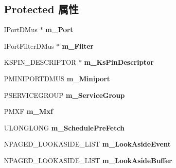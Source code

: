 \subsection*{Protected 属性}
\begin{DoxyCompactItemize}
\item 
\mbox{\label{class_c_port_pin_d_mus_a347a9e04b86f44232d704b138cc05302}} 
I\+Port\+D\+Mus $\ast$ {\bfseries m\+\_\+\+Port}
\item 
\mbox{\label{class_c_port_pin_d_mus_aad98338e05beff90c53315bbf138231e}} 
I\+Port\+Filter\+D\+Mus $\ast$ {\bfseries m\+\_\+\+Filter}
\item 
\mbox{\label{class_c_port_pin_d_mus_addd908cbfb589bab368404f50b5ce1af}} 
K\+S\+P\+I\+N\+\_\+\+D\+E\+S\+C\+R\+I\+P\+T\+OR $\ast$ {\bfseries m\+\_\+\+Ks\+Pin\+Descriptor}
\item 
\mbox{\label{class_c_port_pin_d_mus_a1666e6332ef57659fbe99873211aaf1b}} 
P\+M\+I\+N\+I\+P\+O\+R\+T\+D\+M\+US {\bfseries m\+\_\+\+Miniport}
\item 
\mbox{\label{class_c_port_pin_d_mus_a4489efd3f45607c092f59fb397ac84b8}} 
P\+S\+E\+R\+V\+I\+C\+E\+G\+R\+O\+UP {\bfseries m\+\_\+\+Service\+Group}
\item 
\mbox{\label{class_c_port_pin_d_mus_aff66ac122119d0d14c7b9533f435c646}} 
P\+M\+XF {\bfseries m\+\_\+\+Mxf}
\item 
\mbox{\label{class_c_port_pin_d_mus_afaeeb6ac59425ba3643200a0e7702ae6}} 
U\+L\+O\+N\+G\+L\+O\+NG {\bfseries m\+\_\+\+Schedule\+Pre\+Fetch}
\item 
\mbox{\label{class_c_port_pin_d_mus_a285dd2045b4ab91018d698f3894ca696}} 
N\+P\+A\+G\+E\+D\+\_\+\+L\+O\+O\+K\+A\+S\+I\+D\+E\+\_\+\+L\+I\+ST {\bfseries m\+\_\+\+Look\+Aside\+Event}
\item 
\mbox{\label{class_c_port_pin_d_mus_adb690d2343a558492daa2ee46fe5d353}} 
N\+P\+A\+G\+E\+D\+\_\+\+L\+O\+O\+K\+A\+S\+I\+D\+E\+\_\+\+L\+I\+ST {\bfseries m\+\_\+\+Look\+Aside\+Buffer}

\end{DoxyCompactItemize}
